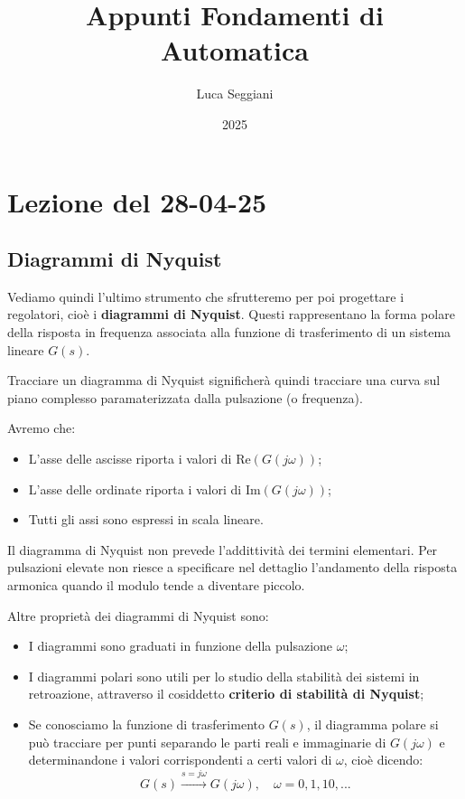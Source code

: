 \documentclass[a4paper,11pt]{article}
\title{Appunti Fondamenti di Automatica}
\author{Luca Seggiani}
\date{2025}
\begin{document}
\section{Lezione del 28-04-25}

\thispagestyle{empty}
\pagestyle{fancy}

\subsection{Diagrammi di Nyquist}
Vediamo quindi l'ultimo strumento che sfrutteremo per poi progettare i regolatori, cioè i \textbf{diagrammi di Nyquist}.
Questi rappresentano la forma polare della risposta in frequenza associata alla funzione di trasferimento di un sistema lineare $G(s)$.

Tracciare un diagramma di Nyquist significherà quindi tracciare una curva sul piano complesso paramaterizzata dalla pulsazione (o frequenza).

Avremo che:
\begin{itemize}
	\item L'asse delle ascisse riporta i valori di $\mathrm{Re}\left( G(j \omega) \right)$;
	\item L'asse delle ordinate riporta i valori di $\mathrm{Im}\left( G(j \omega) \right)$;
	\item Tutti gli assi sono espressi in scala lineare.
\end{itemize}

Il diagramma di Nyquist non prevede l'addittività dei termini elementari.
Per pulsazioni elevate non riesce a specificare nel dettaglio l'andamento della risposta armonica quando il modulo tende a diventare piccolo.

Altre proprietà dei diagrammi di Nyquist sono:
\begin{itemize}
	\item I diagrammi sono graduati in funzione della pulsazione $\omega$;
	\item I diagrammi polari sono utili per lo studio della stabilità dei sistemi in retroazione, attraverso il cosiddetto \textbf{criterio di stabilità di Nyquist};
	\item Se conosciamo la funzione di trasferimento $G(s)$, il diagramma polare si può tracciare per punti separando le parti reali e immaginarie di $G(j\omega)$ e determinandone i valori corrispondenti a certi valori di $\omega$, cioè dicendo:
		$$
		G(s) \xrightarrow{s = j\omega} G(j\omega), \quad \omega = 0, 1, 10, ...
		$$
\end{itemize}
\end{document}
